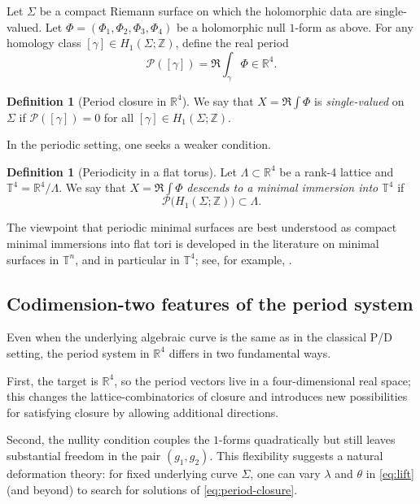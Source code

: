 \documentclass[12pt]{article}
\numberwithin{equation}{section}
\theoremstyle{definition}
\newtheorem{definition}[theorem]{Definition}
\theoremstyle{remark}
\begin{document}
Let $\Sigma$ be a compact Riemann surface on which the holomorphic data are single-valued.
Let $\Phi=(\Phi_1,\Phi_2,\Phi_3,\Phi_4)$ be a holomorphic null $1$-form as above.
For any homology class $[\gamma]\in H_1(\Sigma;\mathbb{Z})$, define the real period
\begin{equation}\label{eq:real-period}
\mathcal{P}([\gamma])=\Re\int_\gamma \Phi\in\mathbb{R}^4.
\end{equation}

\begin{definition}[Period closure in $\mathbb{R}^4$]
We say that $X=\Re\int \Phi$ is \emph{single-valued} on $\Sigma$ if $\mathcal{P}([\gamma])=0$ for all $[\gamma]\in H_1(\Sigma;\mathbb{Z})$.
\end{definition}

In the periodic setting, one seeks a weaker condition.

\begin{definition}[Periodicity in a flat torus]
Let $\Lambda\subset\mathbb{R}^4$ be a rank-4 lattice and $\mathbb{T}^4=\mathbb{R}^4/\Lambda$.
We say that $X=\Re\int \Phi$ \emph{descends to a minimal immersion into $\mathbb{T}^4$} if
\begin{equation}\label{eq:period-closure}
\mathcal{P}\bigl(H_1(\Sigma;\mathbb{Z})\bigr)\subset \Lambda.
\end{equation}
\end{definition}

The viewpoint that periodic minimal surfaces are best understood as compact minimal immersions into flat tori is developed in the literature on minimal surfaces in $\mathbb{T}^n$, and in particular in $\mathbb{T}^4$; see, for example, \cite{ShodaJLMS,ShodaTrigonal,ShodaModuliArXiv}.

\subsection{Codimension-two features of the period system}

Even when the underlying algebraic curve is the same as in the classical P/D setting, the period system in $\mathbb{R}^4$ differs in two fundamental ways.

First, the target is $\mathbb{R}^4$, so the period vectors live in a four-dimensional real space; this changes the lattice-combinatorics of closure and introduces new possibilities for satisfying closure by allowing additional directions.

Second, the nullity condition couples the $1$-forms quadratically but still leaves substantial freedom in the pair $(g_1,g_2)$.
This flexibility suggests a natural deformation theory: for fixed underlying curve $\Sigma$, one can vary $\lambda$ and $\theta$ in \eqref{eq:lift} (and beyond) to search for solutions of \eqref{eq:period-closure}.
\end{document}
